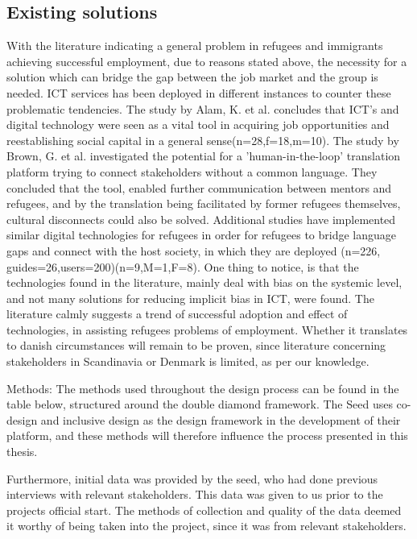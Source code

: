 \subsection{Existing solutions}

With the literature indicating a general problem in refugees and immigrants achieving successful employment, due to reasons stated above, the necessity for a solution which can bridge the gap between the job market and the group is needed. ICT services has been deployed in different instances to counter these problematic tendencies. The study by Alam, K. et al. concludes that ICT's and digital technology were seen as a vital tool in acquiring job opportunities and reestablishing social capital in a general sense\cite{alam2015digital}(n=28,f=18,m=10). The study by Brown, G. et al. \cite{Brown2016} investigated the potential for a 'human-in-the-loop' translation platform trying to connect stakeholders without a common language. They concluded that the tool, enabled further communication between mentors and refugees, and by the translation being facilitated by former refugees themselves, cultural disconnects could also be solved. Additional studies have implemented similar digital technologies for refugees in order for refugees to bridge language gaps and connect with the host society, in which they are deployed \cite{Hirsch2004}(n=226, guides=26,users=200)\cite{Baranoff}(n=9,M=1,F=8). One thing to notice, is that the technologies found in the literature, mainly deal with bias on the systemic level, and not many solutions for reducing implicit bias in ICT, were found. The literature calmly suggests a trend of successful adoption and effect of technologies, in assisting refugees problems of employment. Whether it translates to danish circumstances will remain to be proven, since literature concerning stakeholders in Scandinavia or Denmark is limited, as per our knowledge.

\newpage

Methods: The methods used throughout the design process can be found in the table below, structured around the double diamond framework. The Seed uses co-design\cite{Codesign} and inclusive design\cite{InclusiveDesign} as the design framework in the development of their platform, and these methods will therefore influence the process presented in this thesis.

Furthermore, initial data was provided by the seed, who had done previous interviews with relevant stakeholders. This data was given to us prior to the projects official start. The methods of collection and quality of the data deemed it worthy of being taken into the project, since it was from relevant stakeholders.


